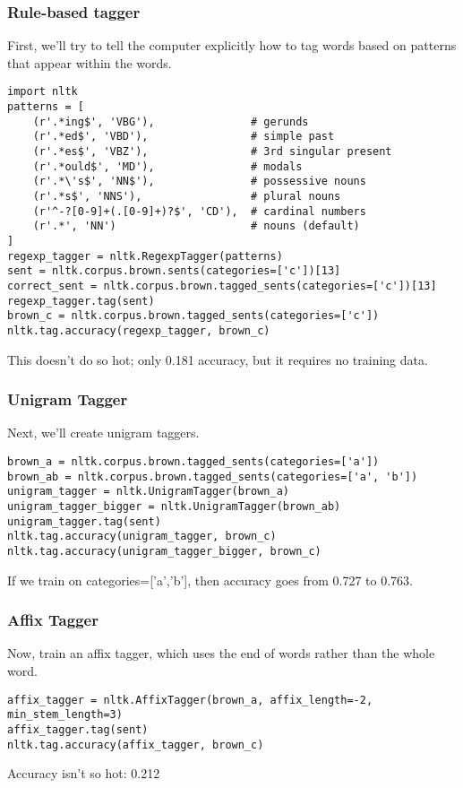 \documentclass{beamer}
\begin{document}
\begin{frame}[fragile]

\frametitle{Rule-based tagger} 

First, we'll try to tell the computer explicitly how to tag words based on patterns that appear within the words.

\footnotesize
\begin{verbatim}
import nltk
patterns = [
	(r'.*ing$', 'VBG'),               # gerunds
	(r'.*ed$', 'VBD'),                # simple past
	(r'.*es$', 'VBZ'),                # 3rd singular present
	(r'.*ould$', 'MD'),               # modals
	(r'.*\'s$', 'NN$'),               # possessive nouns
	(r'.*s$', 'NNS'),                 # plural nouns
	(r'^-?[0-9]+(.[0-9]+)?$', 'CD'),  # cardinal numbers
	(r'.*', 'NN')                     # nouns (default)
]
regexp_tagger = nltk.RegexpTagger(patterns)
sent = nltk.corpus.brown.sents(categories=['c'])[13]
correct_sent = nltk.corpus.brown.tagged_sents(categories=['c'])[13]
regexp_tagger.tag(sent)
brown_c = nltk.corpus.brown.tagged_sents(categories=['c'])
nltk.tag.accuracy(regexp_tagger, brown_c)
\end{verbatim}
\pause
This doesn't do so hot; only 0.181 accuracy, but it requires no training data.

\end{frame}



\begin{frame}[fragile]

\frametitle{Unigram Tagger} 

Next, we'll create unigram taggers.

\footnotesize
\begin{verbatim}
brown_a = nltk.corpus.brown.tagged_sents(categories=['a'])
brown_ab = nltk.corpus.brown.tagged_sents(categories=['a', 'b'])
unigram_tagger = nltk.UnigramTagger(brown_a)
unigram_tagger_bigger = nltk.UnigramTagger(brown_ab)
unigram_tagger.tag(sent)
nltk.tag.accuracy(unigram_tagger, brown_c)
nltk.tag.accuracy(unigram_tagger_bigger, brown_c)
\end{verbatim}
\pause
If we train on categories=['a','b'], then accuracy goes from 0.727 to 0.763.

\end{frame}

\begin{frame}[fragile]

\frametitle{Affix Tagger} 

Now, train an affix tagger, which uses the end of words rather than the whole word.

\footnotesize
\begin{verbatim}
affix_tagger = nltk.AffixTagger(brown_a, affix_length=-2, min_stem_length=3)
affix_tagger.tag(sent)
nltk.tag.accuracy(affix_tagger, brown_c)
\end{verbatim}

\pause
Accuracy isn't so hot: 0.212
\end{frame}
\end{document}
